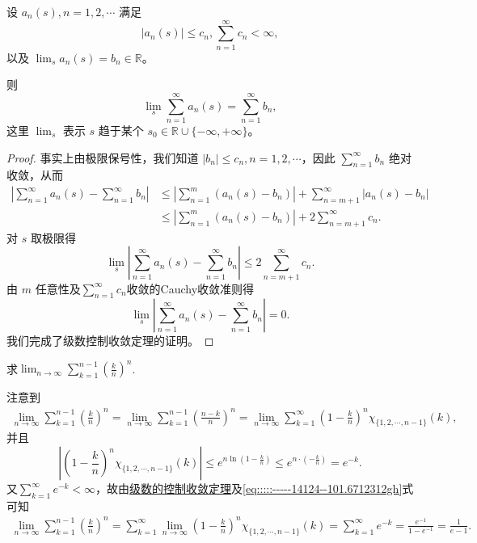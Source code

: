 \documentclass[../../main.tex]{subfiles}%
\begin{document}
\begin{theorem}[级数的控制收敛定理]\label{theorem:级数的控制收敛定理}
设 \( a_n(s), n = 1, 2, \cdots \) 满足
\[
|a_n(s)| \leqslant c_n, \sum_{n = 1}^{\infty} c_n < \infty,
\]
以及 \( \lim_{s} a_n(s) = b_n \in \mathbb{R} \)。

则
\[
\lim_{s} \sum_{n = 1}^{\infty} a_n(s) = \sum_{n = 1}^{\infty} b_n,
\]
这里 \( \lim_{s} \) 表示 \( s \) 趋于某个 \( s_0 \in \mathbb{R} \cup \{-\infty, +\infty\} \)。
\end{theorem}
\begin{proof}
事实上由极限保号性，我们知道 \( |b_n| \leqslant c_n, n = 1, 2, \cdots \)，因此 \( \sum_{n = 1}^{\infty} b_n \) 绝对收敛，从而
\begin{align*}
\left| \sum_{n = 1}^{\infty} a_n(s) - \sum_{n = 1}^{\infty} b_n \right| &\leqslant \left| \sum_{n = 1}^{m} (a_n(s) - b_n) \right| + \sum_{n = m + 1}^{\infty} |a_n(s) - b_n| \\
&\leqslant \left| \sum_{n = 1}^{m} (a_n(s) - b_n) \right| + 2 \sum_{n = m + 1}^{\infty} c_n.
\end{align*}
对 \( s \) 取极限得
\[
\lim_{s} \left| \sum_{n = 1}^{\infty} a_n(s) - \sum_{n = 1}^{\infty} b_n \right| \leqslant 2 \sum_{n = m + 1}^{\infty} c_n.
\]
由 \( m \) 任意性及$\sum_{n=1}^{\infty}{c_n}$收敛的Cauchy收敛准则得
\[
\lim_{s} \left| \sum_{n = 1}^{\infty} a_n(s) - \sum_{n = 1}^{\infty} b_n \right| = 0.
\]
我们完成了级数控制收敛定理的证明。
\end{proof}

\begin{example}
求$\lim_{n\rightarrow \infty}\sum_{k=1}^{n-1}\left( \frac{k}{n} \right) ^n$.
\end{example}
\begin{solution}
注意到
\begin{align}\label{eq:::::-----14124--101.6712312gh}
\lim_{n\rightarrow \infty}\sum_{k=1}^{n-1}\left( \frac{k}{n} \right) ^n=\lim_{n\rightarrow \infty}\sum_{k=1}^{n-1}\left( \frac{n-k}{n} \right) ^n =\lim_{n\rightarrow \infty}\sum_{k=1}^{\infty}\left( 1-\frac{k}{n} \right) ^n\chi _{\{1,2,\cdots ,n-1\}}(k),
\end{align}
并且
\[
\left| \left( 1-\frac{k}{n} \right) ^n\chi _{\{1,2,\cdots ,n-1\}}(k) \right|\leqslant e^{n\ln \left( 1-\frac{k}{n} \right)}\leqslant e^{n\cdot \left( -\frac{k}{n} \right)}=e^{-k}.
\]
又$\sum_{k=1}^{\infty}e^{-k}<\infty$，故由\hyperref[theorem:级数的控制收敛定理]{级数的控制收敛定理}及\eqref{eq:::::-----14124--101.6712312gh}式可知
\begin{align*}
\lim_{n\rightarrow \infty}\sum_{k=1}^{n-1}\left( \frac{k}{n} \right) ^n=\sum_{k=1}^{\infty}\lim_{n\rightarrow \infty}\left( 1-\frac{k}{n} \right) ^n\chi _{\{1,2,\cdots ,n-1\}}(k)=\sum_{k=1}^{\infty}e^{-k}
=\frac{e^{-1}}{1-e^{-1}}=\frac{1}{e-1}.
\end{align*}

\end{solution}
\end{document}
